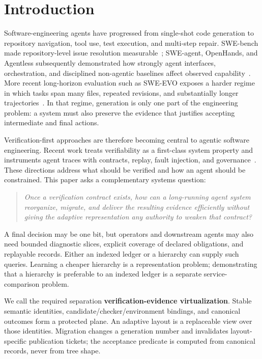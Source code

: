 \documentclass[11pt]{article}
\theoremstyle{definition}\newtheorem{definition}[theorem]{Definition}
\begin{document}
\section{Introduction}
Software-engineering agents have progressed from single-shot code generation to repository navigation, tool use, test execution, and multi-step repair. SWE-bench made repository-level issue resolution measurable~\cite{swebench}; SWE-agent, OpenHands, and Agentless subsequently demonstrated how strongly agent interfaces, orchestration, and disciplined non-agentic baselines affect observed capability~\cite{sweagent,openhands,agentless}. More recent long-horizon evaluation such as SWE-EVO exposes a harder regime in which tasks span many files, repeated revisions, and substantially longer trajectories~\cite{sweevo}. In that regime, generation is only one part of the engineering problem: a system must also preserve the evidence that justifies accepting intermediate and final actions.

Verification-first approaches are therefore becoming central to agentic software engineering. Recent work treats verifiability as a first-class system property and instruments agent traces with contracts, replay, fault injection, and governance~\cite{verificationdriven,aiware,traceassurance}. These directions address what should be verified and how an agent should be constrained. This paper asks a complementary systems question:

\begin{quote}
\begin{minipage}{\linewidth}
\emph{Once a verification contract exists, how can a long-running agent system reorganize, migrate, and deliver the resulting evidence efficiently without giving the adaptive representation any authority to weaken that contract?}
\end{minipage}
\end{quote}

A final decision may be one bit, but operators and downstream agents may also need bounded diagnostic slices, explicit coverage of declared obligations, and replayable records. Either an indexed ledger or a hierarchy can supply such queries. Learning a cheaper hierarchy is a representation problem; demonstrating that a hierarchy is preferable to an indexed ledger is a separate service-comparison problem.

We call the required separation \textbf{verification-evidence virtualization}. Stable semantic identities, candidate/checker/environment bindings, and canonical outcomes form a protected plane. An adaptive layout is a replaceable view over those identities. Migration changes a generation number and invalidates layout-specific publication tickets; the acceptance predicate is computed from canonical records, never from tree shape.
\end{document}
